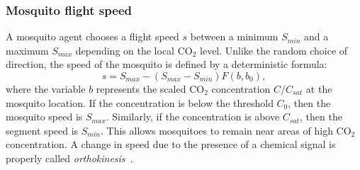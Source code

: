 \documentclass[10pt]{article}
\begin{document}
\subsubsection*{Mosquito flight speed}
A mosquito agent chooses a flight speed $s$ between a minimum $S_{min}$ and a maximum $S_{max}$ depending on the local CO$_2$ level. Unlike the random choice of direction, the speed of the mosquito is defined by a deterministic formula:
\begin{equation*}
	s = S_{max} - (S_{max} -  S_{min})F(b, b_0),
\end{equation*}
where the variable $b$ represents the scaled CO$_2$ concentration $C/C_{sat}$ at the mosquito location.  If the concentration is below the threshold $C_0$, then the mosquito speed is $S_{max}$.  Similarly, if the concentration is above $C_{sat}$, then the segment speed is $S_{min}$.  This allows mosquitoes to remain near areas of high CO$_2$ concentration.  A change in speed due to the presence of a chemical signal is properly called \textit{orthokinesis}~\cite{Pierce-Shimomura1999}.

\end{document}

